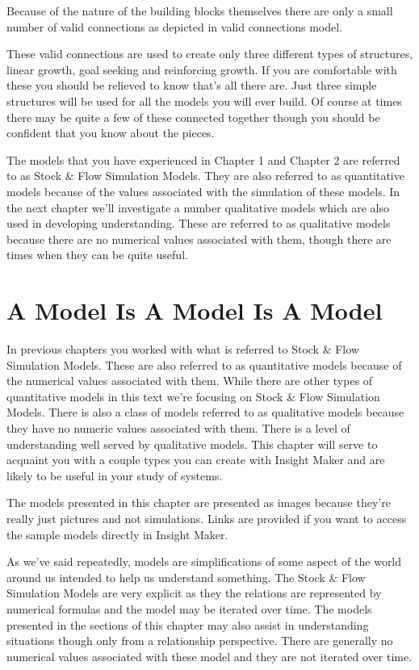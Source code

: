 \documentclass[]{memoir}
\begin{document}
Because of the nature of the building blocks themselves there are only a
small number of valid connections as depicted in valid connections
model.

These valid connections are used to create only three different types of
structures, linear growth, goal seeking and reinforcing growth. If you
are comfortable with these you should be relieved to know that's all
there are. Just three simple structures will be used for all the models
you will ever build. Of course at times there may be quite a few of
these connected together though you should be confident that you know
about the pieces.

The models that you have experienced in Chapter 1 and Chapter 2 are
referred to as Stock \& Flow Simulation Models. They are also referred
to as quantitative models because of the values associated with the
simulation of these models. In the next chapter we'll investigate a
number qualitative models which are also used in developing
understanding. These are referred to as qualitative models because there
are no numerical values associated with them, though there are times
when they can be quite useful.

\chapter{A Model Is A Model Is A Model}

In previous chapters you worked with what is referred to Stock \& Flow
Simulation Models. These are also referred to as quantitative models
because of the numerical values associated with them. While there are
other types of quantitative models in this text we're focusing on Stock
\& Flow Simulation Models. There is also a class of models referred to
as qualitative models because they have no numeric values associated
with them. There is a level of understanding well served by qualitative
models. This chapter will serve to acquaint you with a couple types you
can create with Insight Maker and are likely to be useful in your study
of systems.

The models presented in this chapter are presented as images because
they're really just pictures and not simulations. Links are provided if
you want to access the sample models directly in Insight Maker.

As we've said repeatedly, models are simplifications of some aspect of
the world around us intended to help us understand something. The Stock
\& Flow Simulation Models are very explicit as they the relations are
represented by numerical formulas and the model may be iterated over
time. The models presented in the sections of this chapter may also
assist in understanding situations though only from a relationship
perspective. There are generally no numerical values associated with
these model and they are not iterated over time.
\end{document}
